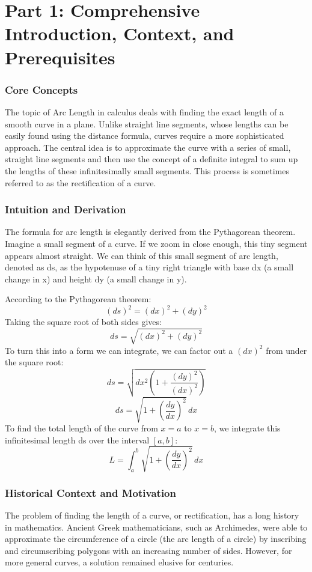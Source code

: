 \documentclass{article}
\begin{document}
\part*{Part 1: Comprehensive Introduction, Context, and Prerequisites}
\section*{Core Concepts}
The topic of Arc Length in calculus deals with finding the exact length of a smooth curve in a plane. Unlike straight line segments, whose lengths can be easily found using the distance formula, curves require a more sophisticated approach. The central idea is to approximate the curve with a series of small, straight line segments and then use the concept of a definite integral to sum up the lengths of these infinitesimally small segments. This process is sometimes referred to as the rectification of a curve.

\section*{Intuition and Derivation}
The formula for arc length is elegantly derived from the Pythagorean theorem. Imagine a small segment of a curve. If we zoom in close enough, this tiny segment appears almost straight. We can think of this small segment of arc length, denoted as ds, as the hypotenuse of a tiny right triangle with base dx (a small change in x) and height dy (a small change in y).

According to the Pythagorean theorem:
\[ (ds)^2 = (dx)^2 + (dy)^2 \]
Taking the square root of both sides gives:
\[ ds = \sqrt{(dx)^2 + (dy)^2} \]
To turn this into a form we can integrate, we can factor out a $(dx)^2$ from under the square root:
\[ ds = \sqrt{dx^2(1 + \frac{(dy)^2}{(dx)^2})} \]
\[ ds = \sqrt{1 + (\frac{dy}{dx})^2} \,dx \]
To find the total length of the curve from $x = a$ to $x = b$, we integrate this infinitesimal length ds over the interval $[a, b]$:
\[ L = \int_{a}^{b} \sqrt{1 + (\frac{dy}{dx})^2} \,dx \]

\section*{Historical Context and Motivation}
The problem of finding the length of a curve, or rectification, has a long history in mathematics. Ancient Greek mathematicians, such as Archimedes, were able to approximate the circumference of a circle (the arc length of a circle) by inscribing and circumscribing polygons with an increasing number of sides. However, for more general curves, a solution remained elusive for centuries.
\end{document}
